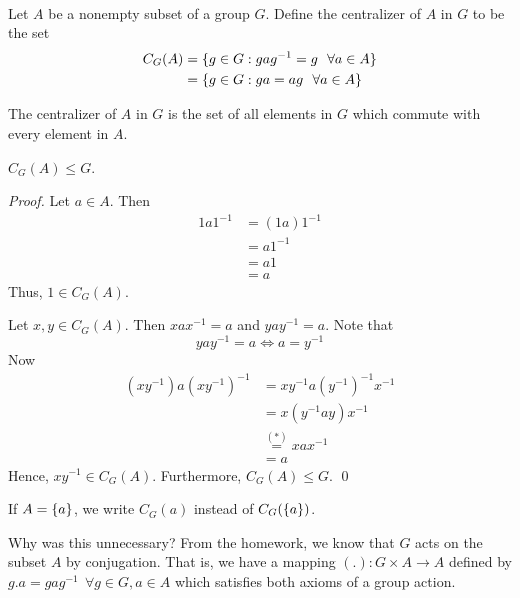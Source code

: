 \begin{definition} [Centralizers] \leavevmode \\
    Let $A$ be a nonempty subset of a group $G$. Define the centralizer of $A$ in $G$ to be the set
    \begin{align*}
        C_G(A) &= \{ g \in G : gag^{-1} = g ~~\forall a \in A \} \\
        &= \left\{g \in G : ga = ag ~~\forall a \in A\right\}
    \end{align*}
\end{definition}

The centralizer of $A$ in $G$ is the set of all elements in $G$ which commute with every element in $A$.

\begin{theorem}
    $C_G(A) \leq G$.
\end{theorem}

\begin{proof}
    Let $a \in A.$ Then 
    \begin{align*}
        1a1^{-1} &= (1a)1^{-1} \\
        &= a1^{-1} \\
        &= a1 \\
        &= a
    \end{align*}
    Thus, $1 \in C_G(A)$.

    Let $x,y \in C_G(A)$. Then $xax^{-1} = a$ and $yay^{-1}=a.$ Note that
    \begin{equation*}
        yay^{-1} = a \iff a = y^{-1}
        \tag{$*$}
    \end{equation*}
    Now
    \begin{align*}
        (xy^{-1})a(xy^{-1})^{-1} &= xy^{-1}a(y^{-1})^{-1}x^{-1} \\
        &= x(y^{-1}ay)x^{-1} \\
        &\overset{(*)}{=} xax^{-1} \\
        &= a
    \end{align*}
    Hence, $xy^{-1} \in C_G(A)$. Furthermore, $C_G(A) \leq G.$
    \qed
\end{proof}

\begin{notation}
    If $A = \left\{a\right\}$, we write $C_G(a)$ instead of $C_G(\left\{a\right\})$.
\end{notation}

Why was this unnecessary? From the homework, we know that $G$ acts on the subset $A$ by conjugation. That is, we have a mapping $(.): G\times A \to A$ defined by $g.a = gag^{-1} ~~\forall g \in G, a \in A$ which satisfies both axioms of a group action.

